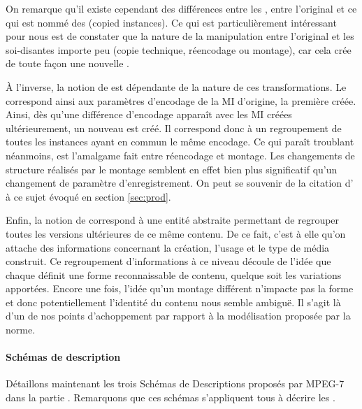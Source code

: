 On remarque qu'il existe cependant des différences entre les , entre l'original et ce qui est nommé des  (copied instances). 
Ce qui est particulièrement intéressant pour nous est de constater que la nature de la manipulation entre l'original et les soi-disantes  importe peu (copie technique, réencodage ou montage), car cela crée de toute façon une nouvelle . 

À l'inverse, la notion de  est dépendante de la nature de ces transformations. 
Le  correspond ainsi aux paramètres d'encodage de la MI d'origine, la première créée. 
Ainsi, dès qu'une différence d'encodage apparaît avec les MI créées ultérieurement, un nouveau  est créé. 
Il correspond donc à un regroupement de toutes les instances ayant en commun le même encodage. 
Ce qui paraît troublant néanmoins, est l'amalgame fait entre réencodage et montage. 
Les changements de structure réalisés par le montage semblent en effet bien plus significatif qu'un changement de paramètre d'enregistrement. 
On peut se souvenir de la citation d' à ce sujet évoqué en section \ref{sec:prod}.

Enfin, la notion de  correspond à une entité abstraite permettant de regrouper toutes les versions ultérieures de ce même contenu.
De ce fait, c'est à elle qu'on attache des informations concernant la création, l'usage et le type de média construit. %
Ce regroupement d'informations à ce niveau découle de l'idée que chaque  définit une forme reconnaissable de contenu, quelque soit les variations apportées.
Encore une fois, l'idée qu'un montage différent n'impacte pas la forme et donc potentiellement l'identité du contenu nous semble ambiguë. 
Il s'agit là d'un de nos points d'achoppement par rapport à la modélisation proposée par la norme. 

\paragraph{Schémas de description}
Détaillons maintenant les trois Schémas de Descriptions proposés par MPEG-7 dans la partie .
Remarquons que ces schémas s'appliquent tous à décrire les .


